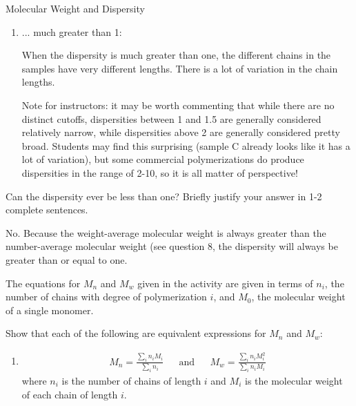 \begin{activity}{Molecular Weight and Dispersity}
\begin{ctqs}
\begin{enumerate}
			\item ... much greater than 1:
			
				\begin{solution}[1in]
					When the dispersity is much greater than one, the different chains in the samples have very different lengths.  There is a lot of variation in the chain lengths.
					
					Note for instructors: it may be worth commenting that while there are no distinct cutoffs, dispersities between 1 and 1.5 are generally considered relatively narrow, while dispersities above 2 are generally considered pretty broad.  Students may find this surprising (sample C already looks like it has a lot of variation), but some commercial polymerizations do produce dispersities in the range of 2-10, so it is all matter of perspective!
				\end{solution}
			
		\end{enumerate}
		
	\question Can the dispersity ever be less than one?  Briefly justify your answer in 1-2 complete sentences.
	
		\begin{solution}[2in]
			No. Because the weight-average molecular weight is always greater than the number-average molecular weight (see question 8, %
			the dispersity will always be greater than or equal to one.
		\end{solution}
	
\end{ctqs}



\begin{exercises}

		\exercise The equations for $M_n$ and $M_w$ given in the activity are given in terms of $n_i$, the number of chains with degree of polymerization $i$, and $M_0$, the molecular weight of a single monomer.
		
		Show that each of the following are equivalent expressions for $M_n$ and $M_w$:
		
			\begin{enumerate}
				
				\item \begin{align*}
					M_n = \frac{\sum_i n_i M_i}{\sum_i n_i} && \text{and} &&  M_w = \frac{\sum_i n_i M_i^2}{\sum_i n_i M_i}
				\end{align*}
					where $n_i$ is the number of chains of length $i$ and $M_i$ is the molecular weight of each chain of length $i$.
					

\end{enumerate}
\end{exercises}
\end{activity}
